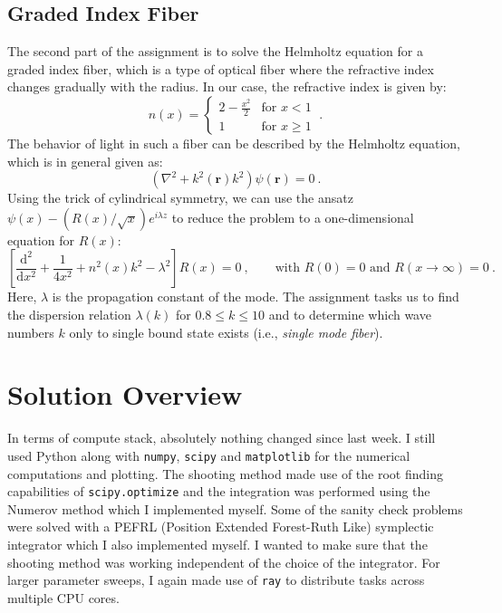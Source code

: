 \documentclass[10pt, titlepage, a4paper]{article}
\newcommand{\bb}[1]{\bm#1}
\newcommand{\dd}{\mathrm{d}}
\begin{document}
\subsection{Graded Index Fiber}
The second part of the assignment is to solve the Helmholtz equation for a graded index fiber, which is a type of optical fiber where the refractive index changes gradually with the radius.
In our case, the refractive index is given by:
%
\begin{equation}
    n(x) = \begin{cases}
    2 - \frac{x^2}{2} & \text{for } x < 1 \\
    1 & \text{for } x \geq 1
    \end{cases}\>.
\end{equation}
%
The behavior of light in such a fiber can be described by the Helmholtz equation, which is in general given as:
%
\begin{equation}
    \left(\nabla^2 + k^2(\bb{r})k^2\right) \psi(\bb{r}) = 0\>.
\end{equation}
%
Using the trick of cylindrical symmetry, we can use the ansatz $\psi(x) - \left(R(x)/\sqrt{x}\right) e^{i\lambda z}$ to reduce the problem to a one-dimensional equation for $R(x)$:
%
\begin{equation}
    \left[\frac{\dd^2}{\dd x^2} + \frac{1}{4x^2} + n^2(x)k^2 - \lambda^2\right] R(x) = 0\>,\qquad \text{with } R(0) = 0 \text{ and } R(x\to\infty) = 0\>.
\end{equation}
%
Here, $\lambda$ is the propagation constant of the mode. The assignment tasks us to find the dispersion relation $\lambda(k)$ for $0.8 \leq k \leq 10$ and to determine which 
wave numbers $k$ only to single bound state exists (i.e., \textit{single mode fiber}).

\section{Solution Overview}
In terms of compute stack, absolutely nothing changed since last week. I still used Python along with \texttt{numpy}, \texttt{scipy} and \texttt{matplotlib} for the numerical computations and plotting.
The shooting method made use of the root finding capabilities of \texttt{scipy.optimize} and the integration was performed using the Numerov method which I implemented myself. Some of the sanity check 
problems were solved with a PEFRL (Position Extended Forest-Ruth Like) symplectic integrator which I also implemented myself. I wanted to make sure that the shooting method was working independent of 
the choice of the integrator. For larger parameter sweeps, I again made use of \texttt{ray} to distribute tasks across multiple CPU cores. \\
\end{document}
